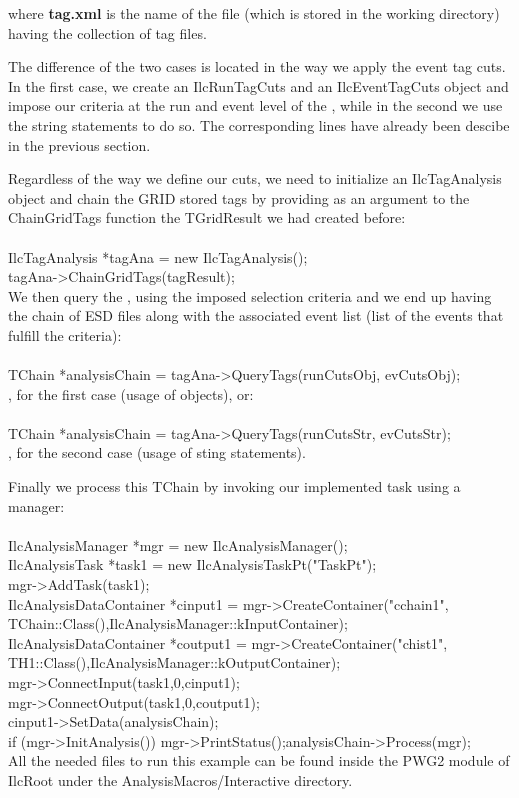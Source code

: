 \noindent where \textbf{tag.xml} is the name of the file (which is stored in the working directory) having the collection of tag files. 

The difference of the two cases is located in the way we apply the event tag cuts. In the first case, we create an {\ttfamily IlcRunTagCuts} and an {\ttfamily IlcEventTagCuts} object and impose our criteria at the run and event level of the \tag, while in the second we use the string statements to do so. The corresponding lines have already been descibe in the previous section. 


Regardless of the way we define our cuts, we need to initialize an {\ttfamily IlcTagAnalysis} object and chain the GRID stored tags by providing as an argument to the {\ttfamily ChainGridTags} function the {\ttfamily TGridResult} we had created before:\\
\\
{\ttfamily IlcTagAnalysis *tagAna = new IlcTagAnalysis();}\\
{\ttfamily tagAna->ChainGridTags(tagResult);}\\

We then query the \tag, using the imposed selection criteria and we end up having the chain of ESD files along with the associated event list (list of the events that fulfill the criteria):\\
\\
{\ttfamily TChain *analysisChain = tagAna->QueryTags(runCutsObj, evCutsObj);}\\
\noindent, for the first case (usage of objects), or: \\
\\
{\ttfamily TChain *analysisChain = tagAna->QueryTags(runCutsStr, evCutsStr);}\\
\noindent, for the second case (usage of sting statements).

Finally we process this {\ttfamily TChain} by invoking our implemented task using a manager:\\
\\
{\ttfamily  IlcAnalysisManager *mgr = new IlcAnalysisManager();}\\
{\ttfamily  IlcAnalysisTask *task1 = new IlcAnalysisTaskPt("TaskPt");}\\
{\ttfamily  mgr->AddTask(task1);}\\
{\ttfamily  IlcAnalysisDataContainer *cinput1 = mgr->CreateContainer("cchain1", TChain::Class(),IlcAnalysisManager::kInputContainer);}\\
{\ttfamily  IlcAnalysisDataContainer *coutput1 = mgr->CreateContainer("chist1", TH1::Class(),IlcAnalysisManager::kOutputContainer);}\\
{\ttfamily  mgr->ConnectInput(task1,0,cinput1);}\\
{\ttfamily  mgr->ConnectOutput(task1,0,coutput1);}\\
{\ttfamily  cinput1->SetData(analysisChain);}\\  
{\ttfamily  if (mgr->InitAnalysis()) {mgr->PrintStatus();analysisChain->Process(mgr);}}\\

All the needed files to run this example can be found inside the PWG2 module of IlcRoot under the AnalysisMacros/Interactive directory.

